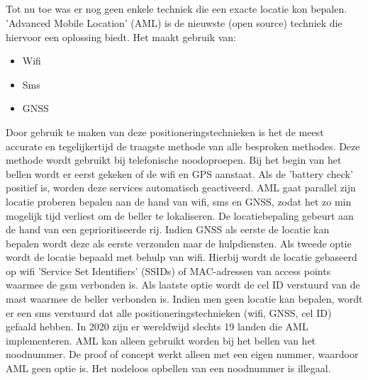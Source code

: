 \subsection{}
Tot nu toe was er nog geen enkele techniek die een exacte locatie kon bepalen. 'Advanced Mobile Location' (AML) is de nieuwste (open source) techniek die hiervoor een oplossing biedt. Het maakt gebruik van:
\begin{itemize}
	\item Wifi
	\item Sms
	\item GNSS
\end{itemize}
Door gebruik te maken van deze positioneringstechnieken is het de meest accurate en tegelijkertijd de traagste methode van alle besproken methodes. 
\newline
Deze methode wordt gebruikt bij telefonische noodoproepen. Bij het begin van het bellen wordt er eerst gekeken of de wifi en GPS aanstaat. Als de 'battery check' positief is, worden deze services automatisch geactiveerd. 
\newline
AML gaat parallel zijn locatie proberen bepalen aan de hand van wifi, sms en GNSS, zodat het zo min mogelijk tijd verliest om de beller te lokaliseren. De locatiebepaling gebeurt aan de hand van een geprioritiseerde rij. Indien GNSS als eerste de locatie kan bepalen wordt deze als eerste verzonden naar de hulpdiensten. 
Als tweede optie wordt de locatie bepaald met behulp van wifi. Hierbij wordt de locatie gebaseerd op wifi 'Service Set Identifiers' (SSIDs) of MAC-adressen van access points waarmee de gsm verbonden is. Als laatste optie wordt de cel ID verstuurd van de mast waarmee de beller verbonden is. Indien men geen locatie kan bepalen, wordt er een sms verstuurd dat alle positioneringstechnieken (wifi, GNSS, cel ID) gefaald hebben.
\newline
In 2020 zijn er wereldwijd slechts 19 landen die AML implementeren. AML kan alleen gebruikt worden bij het bellen van het noodnummer. De proof of concept werkt alleen met een eigen nummer, waardoor AML geen optie is. \autocite{aml} Het nodeloos opbellen van een noodnummer is illegaal.
